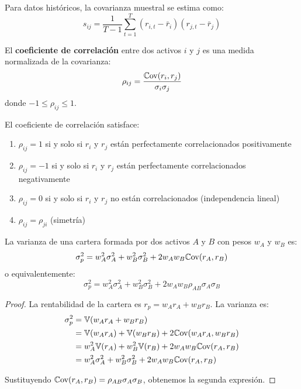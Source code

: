 Para datos históricos, la covarianza muestral se estima como:
\begin{equation}
s_{ij} = \frac{1}{T-1} \sum_{t=1}^{T} (r_{i,t} - \bar{r}_i)(r_{j,t} - \bar{r}_j)
\end{equation}

\begin{definicion}
El \textbf{coeficiente de correlación} entre dos activos $i$ y $j$ es una medida normalizada de la covarianza:
\begin{equation}
\rho_{ij} = \frac{\mathbb{C}\text{ov}(r_i, r_j)}{\sigma_i \sigma_j}
\end{equation}
donde $-1 \leq \rho_{ij} \leq 1$.
\end{definicion}

\begin{proposicion}
El coeficiente de correlación satisface:
\begin{enumerate}
\item $\rho_{ij} = 1$ si y solo si $r_i$ y $r_j$ están perfectamente correlacionados positivamente
\item $\rho_{ij} = -1$ si y solo si $r_i$ y $r_j$ están perfectamente correlacionados negativamente
\item $\rho_{ij} = 0$ si y solo si $r_i$ y $r_j$ no están correlacionados (independencia lineal)
\item $\rho_{ij} = \rho_{ji}$ (simetría)
\end{enumerate}
\end{proposicion}

\begin{teorema}
La varianza de una cartera formada por dos activos $A$ y $B$ con pesos $w_A$ y $w_B$ es:
\begin{equation}
\sigma_p^2 = w_A^2 \sigma_A^2 + w_B^2 \sigma_B^2 + 2 w_A w_B \mathbb{C}\text{ov}(r_A, r_B)
\end{equation}
o equivalentemente:
\begin{equation}
\sigma_p^2 = w_A^2 \sigma_A^2 + w_B^2 \sigma_B^2 + 2 w_A w_B \rho_{AB} \sigma_A \sigma_B
\end{equation}
\end{teorema}

\begin{proof}
La rentabilidad de la cartera es $r_p = w_A r_A + w_B r_B$. La varianza es:
\begin{align*}
\sigma_p^2 &= \mathbb{V}(w_A r_A + w_B r_B) \\
&= \mathbb{V}(w_A r_A) + \mathbb{V}(w_B r_B) + 2\mathbb{C}\text{ov}(w_A r_A, w_B r_B) \\
&= w_A^2 \mathbb{V}(r_A) + w_B^2 \mathbb{V}(r_B) + 2 w_A w_B \mathbb{C}\text{ov}(r_A, r_B) \\
&= w_A^2 \sigma_A^2 + w_B^2 \sigma_B^2 + 2 w_A w_B \mathbb{C}\text{ov}(r_A, r_B)
\end{align*}

Sustituyendo $\mathbb{C}\text{ov}(r_A, r_B) = \rho_{AB} \sigma_A \sigma_B$, obtenemos la segunda expresión.
\end{proof}

